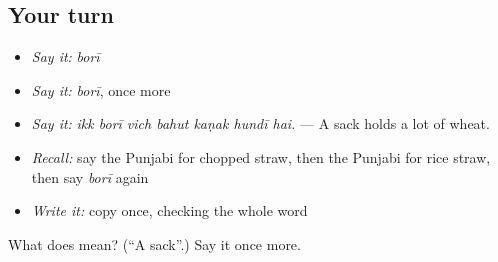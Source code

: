 \subsection*{Your turn}
\begin{itemize}
\raggedright
  \item \emph{Say it:} \emph{borī}
  \item \emph{Say it:} \emph{borī}, once more
  \item \emph{Say it:} \emph{ikk borī vich bahut kaṇak hundī hai.} — A sack holds a lot of wheat.
  \item \emph{Recall:} say the Punjabi for chopped straw, then the Punjabi for rice straw, then say \emph{borī} again
  \item \emph{Write it:} copy \textbf{} once, checking the whole word
\end{itemize}

\begin{tcolorbox}[breakable,colback=teal!4,colframe=teal!35!black,title={Before you move on}]
What does  mean? (\textquotedblleft{}A sack\textquotedblright{}.) Say it once more.
\end{tcolorbox}
